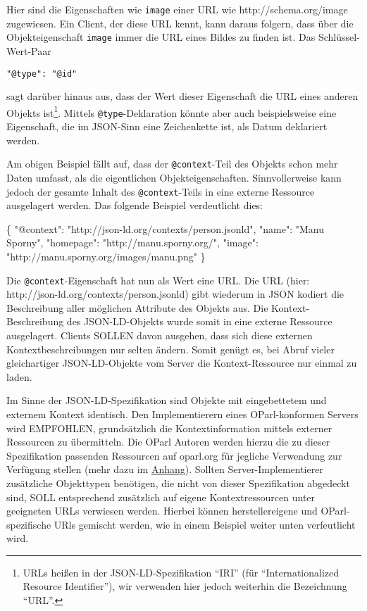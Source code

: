 \documentclass[,a4paper]{article}
\newenvironment{Shaded}{}{}
\newcommand{\DataTypeTok}[1]{\textcolor[rgb]{0.56,0.13,0.00}{{#1}}}
\newcommand{\StringTok}[1]{\textcolor[rgb]{0.25,0.44,0.63}{{#1}}}
\newcommand{\NormalTok}[1]{{#1}}
\begin{document}
Hier sind die Eigenschaften wie \texttt{image} einer URL wie
http://schema.org/image zugewiesen. Ein Client, der diese URL kennt,
kann daraus folgern, dass über die Objekteigenschaft \texttt{image}
immer die URL eines Bildes zu finden ist. Das Schlüssel-Wert-Paar

\begin{verbatim}
"@type": "@id"
\end{verbatim}

sagt darüber hinaus aus, dass der Wert dieser Eigenschaft die URL eines
anderen Objekts ist\footnote{URLs heißen in der JSON-LD-Spezifikation
  ``IRI'' (für ``Internationalized Resource Identifier''), wir verwenden
  hier jedoch weiterhin die Bezeichnung ``URL''.}. Mittels
\texttt{@type}-Deklaration könnte aber auch beispielsweise eine
Eigenschaft, die im JSON-Sinn eine Zeichenkette ist, als Datum
deklariert werden.

Am obigen Beispiel fällt auf, dass der \texttt{@context}-Teil des
Objekts schon mehr Daten umfasst, als die eigentlichen
Objekteigenschaften. Sinnvollerweise kann jedoch der gesamte Inhalt des
\texttt{@context}-Teils in eine externe Ressource ausgelagert werden.
Das folgende Beispiel verdeutlicht dies:

\begin{Shaded}
\begin{Highlighting}[]
\NormalTok{\{}
  \DataTypeTok{"@context"}\NormalTok{: }\StringTok{"http://json-ld.org/contexts/person.jsonld"}\NormalTok{,}
  \DataTypeTok{"name"}\NormalTok{: }\StringTok{"Manu Sporny"}\NormalTok{,}
  \DataTypeTok{"homepage"}\NormalTok{: }\StringTok{"http://manu.sporny.org/"}\NormalTok{,}
  \DataTypeTok{"image"}\NormalTok{: }\StringTok{"http://manu.sporny.org/images/manu.png"}
\NormalTok{\}}
\end{Highlighting}
\end{Shaded}

Die \texttt{@context}-Eigenschaft hat nun als Wert eine URL. Die URL
(hier: http://json-ld.org/contexts/person.jsonld) gibt wiederum in JSON
kodiert die Beschreibung aller möglichen Attribute des Objekts aus. Die
Kontext-Beschreibung des JSON-LD-Objekts wurde somit in eine externe
Ressource ausgelagert. Clients SOLLEN davon ausgehen, dass sich diese
externen Kontextbeschreibungen nur selten ändern. Somit genügt es, bei
Abruf vieler gleichartiger JSON-LD-Objekte vom Server die
Kontext-Ressource nur einmal zu laden.

Im Sinne der JSON-LD-Spezifikation sind Objekte mit eingebettetem und
externem Kontext identisch. Den Implementierern eines OParl-konformen
Servers wird EMPFOHLEN, grundsätzlich die Kontextinformation mittels
externer Ressourcen zu übermitteln. Die OParl Autoren werden hierzu die
zu dieser Spezifikation passenden Ressourcen auf oparl.org für jegliche
Verwendung zur Verfügung stellen (mehr dazu im
\hyperref[jsonldux5fressourcenux5foparlorg]{Anhang}). Sollten
Server-Implementierer zusätzliche Objekttypen benötigen, die nicht von
dieser Spezifikation abgedeckt sind, SOLL entsprechend zusätzlich auf
eigene Kontextressourcen unter geeigneten URLs verwiesen werden. Hierbei
können herstellereigene und OParl-spezifische URls gemischt werden, wie
in einem Beispiel weiter unten verfeutlicht wird.
\end{document}
